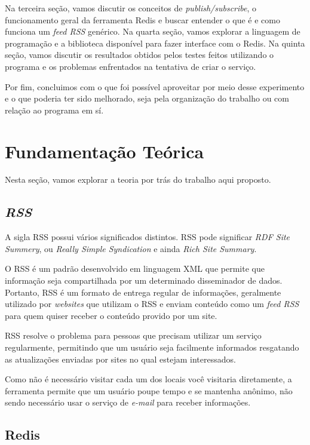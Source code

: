 \documentclass[10pt]{IEEEtran}
\begin{document}
Na terceira seção, vamos discutir os conceitos de \textit{publish/subscribe}, o funcionamento geral da ferramenta Redis e buscar entender o que é e como funciona um \textit{feed RSS} genérico. Na quarta seção, vamos explorar a linguagem de programação e a biblioteca disponível para fazer interface com o Redis. Na quinta seção, vamos discutir os resultados obtidos pelos testes feitos utilizando o programa e os problemas enfrentados na tentativa de criar o serviço. 

Por fim, concluimos com o que foi possível aproveitar por meio desse experimento e o que poderia ter sido melhorado, seja pela organização do trabalho ou com relação ao programa em sí.

\section{Fundamentação Teórica}
Nesta seção, vamos explorar a teoria por trás do trabalho aqui proposto.

\subsection{\textit{RSS}}

A sigla RSS possui vários significados distintos. RSS pode significar \textit{RDF Site Summery}, ou \textit{Really Simple Syndication} e ainda \textit{Rich Site Summary}.

O RSS é um padrão desenvolvido em linguagem XML que permite que informação seja compartilhada por um determinado disseminador de dados. Portanto, RSS é um formato de entrega regular de informações, geralmente utilizado por \textit{websites} que utilizam o RSS e enviam conteúdo como um \textit{feed RSS} para quem quiser receber o conteúdo provido por um site.

RSS resolve o problema para pessoas que precisam utilizar um serviço regularmente, permitindo que um usuário seja facilmente informados resgatando as atualizações enviadas por sites no qual estejam interessados.

Como não é necessário visitar cada um dos locais você visitaria diretamente, a ferramenta permite que um usuário poupe tempo e se mantenha anônimo, não sendo necessário usar o serviço de \textit{e-mail} para receber informações.

\subsection{Redis}
\end{document}
